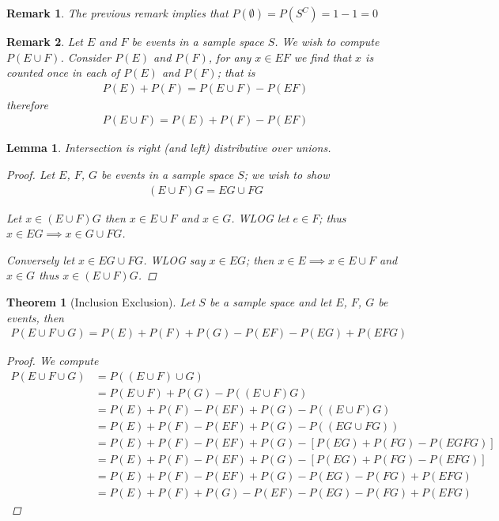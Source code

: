 \documentclass[11pt, oneside]{book}   	%
\newtheorem{remark}{Remark}[chapter]
\newtheorem{lemma}{Lemma}[chapter]
\newtheorem{theorem}{Theorem}[chapter]
\begin{document}
\begin{spacing}{1.618}
\begin{remark}
	The previous remark implies that $P(\emptyset)=P\left(S^C\right)=1-1=0$
\end{remark}

\begin{remark}
	Let $E$ and $F$ be events in a sample space $S$. We wish to compute $P(E\cup F)$. Consider $P(E)$ and $P(F)$, for any $x\in EF$ we find that $x$ is counted once in each of $P(E)$ and $P(F)$; that is
	\begin{alignat}{4}
		P(E)+P(F)=P(E\cup F)-P(EF)
	\end{alignat}
	therefore 
	\begin{alignat}{4}
		P(E\cup F)=P(E)+P(F)-P(EF)
	\end{alignat}

\end{remark}

\begin{lemma}
	Intersection is right (and left) distributive over unions. 
	\begin{proof}
		Let $E$, $F$, $G$ be events in a sample space $S$; we wish to show
		\begin{alignat}{4}
			(E\cup F)G=EG\cup FG
		\end{alignat}
		
		Let $x\in (E\cup F)G$ then $x\in E\cup F$ and $x\in G$. WLOG let $e\in F$; thus $x\in EG\implies x\in G\cup FG$. 
		
		Conversely let $x\in EG\cup FG$. WLOG say $x\in EG$; then $x\in E\implies x\in E\cup F$ and $x\in G$ thus $x\in (E\cup F)G$. 
	\end{proof}
\end{lemma}

\begin{theorem}[Inclusion Exclusion]
	Let $S$ be a sample space and let $E$, $F$, $G$ be events, then 
	\begin{alignat}{4}
		P(E\cup F\cup G)=P(E)+P(F)+P(G)-P(EF)-P(EG)+P(EFG)
	\end{alignat}
	\begin{proof}
		We compute
		\begin{alignat*}{4}
			P(E\cup F \cup G)&=P((E\cup F)\cup G) \\
				&=P(E\cup F)+P(G)-P((E\cup F)G) \\
				&=P(E)+P(F)-P(EF)+P(G)-P((E\cup F)G) \\
				&=P(E)+P(F)-P(EF)+P(G)-P((EG\cup FG)) \\
				&=P(E)+P(F)-P(EF)+P(G)-\left[P(EG) + P(FG) - P(EGFG)\right] \\
				&=P(E)+P(F)-P(EF)+P(G)-\left[P(EG) + P(FG) - P(EFG)\right] \\
				&=P(E)+P(F)-P(EF)+P(G)-P(EG)-P(FG)+P(EFG) \\
				&=P(E)+P(F)+P(G)-P(EF)-P(EG)-P(FG)+P(EFG)
		\end{alignat*}
	\end{proof}
\end{theorem}


\end{spacing}
\end{document}
